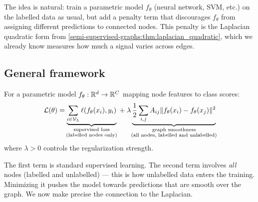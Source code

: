 \begin{notechapter}
The idea is natural: train a parametric model $f_\theta$ (neural network, SVM,
etc.) on the labelled data as usual, but add a penalty term that discourages
$f_\theta$ from assigning different predictions to connected nodes. This
penalty is the Laplacian quadratic form from \cref{semi-supervised-graphs:thm:laplacian_quadratic},
which we already know measures how much a signal varies across edges.

\subsection{General framework}

\begin{definition}
\label{semi-supervised-graphs:def:graph_reg}
For a parametric model $f_\theta: \mathbb{R}^d \to \mathbb{R}^C$ mapping node features to
class scores:
\begin{equation}
\label{semi-supervised-graphs:eq:graph_reg}
\mathcal{L}(\theta) =
\underbrace{
    \sum_{i \in \mathcal{V}_L}\ell(f_\theta(x_i), y_i)}_{
        \mathclap{\substack{\text{supervised loss} \\
        \text{(labelled nodes only)}}}} \; + \;
\lambda\underbrace{\frac{1}{2}\sum_{i,j}A_{ij}\|f_\theta(x_i) -
f_\theta(x_j)\|^2}_{\mathclap{\substack{\text{graph smoothness} \\
\text{(all nodes, labelled and unlabelled)}}}}
\end{equation}
where $\lambda > 0$ controls the regularization strength.
\end{definition}

The first term is standard supervised learning. The second term involves
\emph{all} nodes (labelled and unlabelled) --- this is how unlabelled data enters
the training. Minimizing it pushes the model towards predictions that are smooth
over the graph. We now make precise the connection to the Laplacian.


\end{notechapter}
